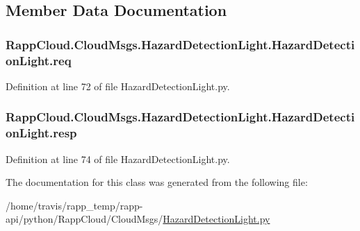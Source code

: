 \subsection{Member Data Documentation}
\hypertarget{classRappCloud_1_1CloudMsgs_1_1HazardDetectionLight_1_1HazardDetectionLight_aa7b0d1e374b7292fd6b3c9061a28217a}{
\subsubsection[{req}]{\setlength{\rightskip}{0pt plus 5cm}Rapp\-Cloud.\-Cloud\-Msgs.\-Hazard\-Detection\-Light.\-Hazard\-Detection\-Light.\-req}}\label{classRappCloud_1_1CloudMsgs_1_1HazardDetectionLight_1_1HazardDetectionLight_aa7b0d1e374b7292fd6b3c9061a28217a}


Definition at line 72 of file Hazard\-Detection\-Light.\-py.

\hypertarget{classRappCloud_1_1CloudMsgs_1_1HazardDetectionLight_1_1HazardDetectionLight_acbdf04d457b8e7a5d5b5b81b1edafbaa}{
\subsubsection[{resp}]{\setlength{\rightskip}{0pt plus 5cm}Rapp\-Cloud.\-Cloud\-Msgs.\-Hazard\-Detection\-Light.\-Hazard\-Detection\-Light.\-resp}}\label{classRappCloud_1_1CloudMsgs_1_1HazardDetectionLight_1_1HazardDetectionLight_acbdf04d457b8e7a5d5b5b81b1edafbaa}


Definition at line 74 of file Hazard\-Detection\-Light.\-py.



The documentation for this class was generated from the following file\-:\begin{DoxyCompactItemize}
\item 
/home/travis/rapp\-\_\-temp/rapp-\/api/python/\-Rapp\-Cloud/\-Cloud\-Msgs/\hyperlink{HazardDetectionLight_8py}{Hazard\-Detection\-Light.\-py}\end{DoxyCompactItemize}
